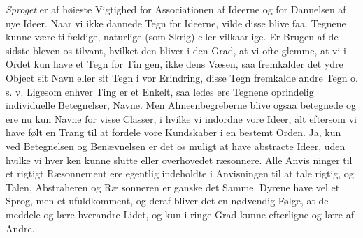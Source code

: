 \documentclass[12pt,a4paper]{book}
\begin{document}
\emph{Sproget} er af høieste Vigtighed for Associationen af
Ideerne og for Dannelsen af nye Ideer. Naar vi ikke dannede
Tegn for Ideerne, vilde disse blive faa. Tegnene kunne være
tilfældige, naturlige (som Skrig) eller vilkaarlige. Er Brugen
af de sidste bleven os tilvant, hvilket den bliver i den Grad,
at vi ofte glemme, at vi i Ordet kun have et Tegn for Tin\-%
gen, ikke dens Væsen, saa fremkalder det ydre Object sit
Navn eller sit Tegn i vor Erindring, disse Tegn fremkalde
andre Tegn o. s. v. Ligesom enhver Ting er et Enkelt, saa\-%
ledes ere Tegnene oprindelig individuelle Betegnelser, Navne.
Men Almeenbegreberne blive ogsaa betegnede og ere nu kun
Navne for visse Classer, i hvilke vi indordne vore Ideer, alt
eftersom vi have følt en Trang til at fordele vore Kundskaber
i en bestemt Orden. Ja, kun ved Betegnelsen og Benævnelsen
er det os muligt at have abstracte Ideer, uden hvilke vi hver\-%
ken kunne slutte eller overhovedet ræsonnere. Alle Anvis\-%
ninger til et rigtigt Ræsonnement ere egentlig indeholdte i
Anvisningen til at tale rigtig, og Talen, Abstraheren og Ræ\-%
sonneren er ganske det Samme. Dyrene have vel et Sprog,
men et ufuldkomment, og deraf bliver det en nødvendig Følge,
at de meddele og lære hverandre Lidet, og kun i ringe Grad
kunne efterligne og lære af Andre. ---
\end{document}
